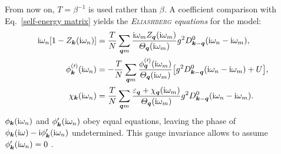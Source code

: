 From now on, $T = \beta^{-1}$ is used rather than $\beta$. A coefficient
comparison with Eq.~\ref{self-energy matrix} yields the
\emph{\textsc{Eliashberg} equations} for the  model:
%
\begin{subequations} \label{Eliashberg equations}
    \begin{align}
        \mathrm i \omega_n [1 - Z_{\boldsymbol k}(\mathrm i \omega_n)] &= \frac T N
        \sum_{\boldsymbol q m} \frac
            {\mathrm i \omega_m Z_{\boldsymbol q}(\mathrm i \omega_m)}
            {\varTheta_{\boldsymbol q}(\mathrm i \omega_m)}
        g^2 D^0_{\boldsymbol k - \boldsymbol q}(\mathrm i \omega_n - \mathrm i \omega_m),
        \\
        \phi^{(\prime)}_{\boldsymbol k}(\mathrm i \omega_n) &= -\frac T N
        \sum_{\boldsymbol q m} \frac
            {\phi^{(\prime)}_{\boldsymbol q}(\mathrm i \omega_m)}
            {\varTheta_{\boldsymbol q}(\mathrm i \omega_m)}
        \big[ g^2 D^0_{\boldsymbol k - \boldsymbol q}(\mathrm i \omega_n - \mathrm i \omega_m) + U \big],
        \\
        \chi_{\boldsymbol k}(\mathrm i \omega_n) &= \frac T N
        \sum_{\boldsymbol q m} \frac
            {\varepsilon_{\boldsymbol q} + \chi_{\boldsymbol q}(\mathrm i \omega_m)}
            {\varTheta_{\boldsymbol q}(\mathrm i \omega_m)}
        g^2 D^0_{\boldsymbol k - \boldsymbol q}(\mathrm i \omega_n - \mathrm i \omega_m).
    \end{align}
\end{subequations}
%
$\phi_{\boldsymbol k}(\mathrm i \omega_n)$ and $\phi'_{\boldsymbol k}(\mathrm i \omega_n)$ obey equal
equations, leaving the phase of $\phi_{\boldsymbol k}(\mathrm i \omega) - \mathrm i \phi'_{\boldsymbol k}(\mathrm i
\omega_n)$ undetermined. This gauge invariance allows to assume $\phi'_{\boldsymbol
k}(\mathrm i \omega_n) = 0$ \cites[37]{AllenMitrovic82}[around Eq.~2.20]{Nambu60}.


